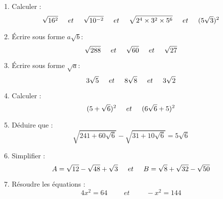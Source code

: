 \documentclass[a4paper,12pt]{article}
\begin{document}
\begin{exo}
\begin{enumerate}
\item Calculer :
\[ \sqrt{16^{2}} \hspace*{0.5cm} et\hspace*{0.5cm}
 \sqrt{10^{-2}} \hspace*{0.5cm}et\hspace*{0.5cm}
  \sqrt{2^{4}\times 3^{2}\times 5^{6}} \hspace*{0.5cm}et \hspace*{0.5cm}
   (5\sqrt{3})^{2}  \]
   
 \item Écrire sous forme $a\sqrt{b}$:  
 \[  \sqrt{288}\hspace*{0.5cm}et\hspace*{0.5cm}
\sqrt{60}\hspace*{0.5cm}et\hspace*{0.5cm}
\sqrt{27}   \]

\item Écrire sous forme $\sqrt{a}$:
\[  3\sqrt{5}\hspace*{0.5cm}et\hspace*{0.5cm}
8\sqrt{8}\hspace*{0.5cm}et\hspace*{0.5cm}
3\sqrt{2}   \]

\item Calculer :
\[   (5+\sqrt{6})^{2}\hspace*{0.5cm}et\hspace*{0.5cm}
	(6\sqrt{6}+5)^{2}  \]
	
\item Déduire que :
\[  \sqrt{241+60\sqrt{6}}-\sqrt{31+10\sqrt{6}}=5\sqrt{6}  \]

\item Simplifier :
\[
A=\sqrt{12}-\sqrt{48}+\sqrt{3}
\hspace*{0.5cm}et\hspace*{0.5cm}
B=\sqrt{8}+\sqrt{32}-\sqrt{50}
\]

\item Résoudre les équations :
\[
4x^{2}=64
\hspace{1cm}et\hspace{1cm}
-x^{2}=144
\]	
\end{enumerate}

\end{exo}
\end{document}
